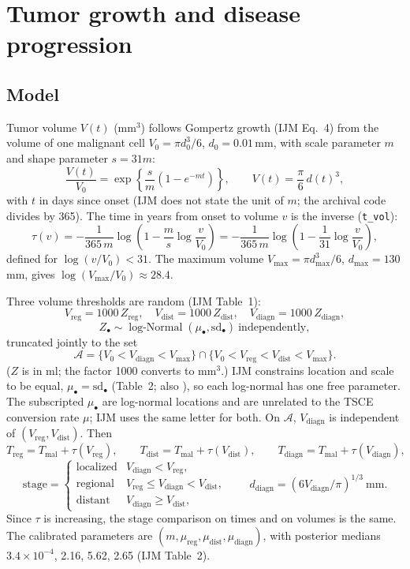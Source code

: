 \documentclass[11pt]{article}
\newcommand{\code}[1]{\texttt{#1}}
\newcommand{\LN}{\operatorname{log\text{-}Normal}}
\newcommand{\Tmal}{T_{\mathrm{mal}}}
\newcommand{\Treg}{T_{\mathrm{reg}}}
\newcommand{\Tdist}{T_{\mathrm{dist}}}
\newcommand{\Tdiagn}{T_{\mathrm{diagn}}}
\newcommand{\Vreg}{V_{\mathrm{reg}}}
\newcommand{\Vdist}{V_{\mathrm{dist}}}
\newcommand{\Vdiagn}{V_{\mathrm{diagn}}}
\begin{document}
\section{Tumor growth and disease progression}\label{sec:progression}

\subsection{Model}
Tumor volume $V(t)$ (mm$^3$) follows Gompertz growth (IJM Eq.~4) from the
volume of one malignant cell $V_0 = \pi d_0^3/6$, $d_0=0.01$\,mm, with scale
parameter $m$ and shape parameter $s = 31m$:
\[
\frac{V(t)}{V_0} = \exp\!\left\{\frac{s}{m}\left(1 - e^{-m t}\right)\right\},
\qquad V(t) = \frac{\pi}{6}\,d(t)^3 ,
\]
with $t$ in days since onset (IJM does not state the unit of $m$; the archival
code divides by 365). The time in years from onset to volume $v$ is the inverse
(\code{t\_vol}):
\begin{equation}\label{eq:tvol}
\tau(v) = -\frac{1}{365\,m}\log\!\left(1 - \frac{m}{s}\log\frac{v}{V_0}\right)
        = -\frac{1}{365\,m}\log\!\left(1 - \frac{1}{31}\log\frac{v}{V_0}\right),
\end{equation}
defined for $\log(v/V_0) < 31$. The maximum volume
$V_{\max}=\pi d_{\max}^3/6$, $d_{\max}=130$\,mm, gives $\log(V_{\max}/V_0)\approx 28.4$.

Three volume thresholds are random (IJM Table~1):
\[
\Vreg = 1000\,Z_{\mathrm{reg}},\quad \Vdist = 1000\,Z_{\mathrm{dist}},\quad
\Vdiagn = 1000\,Z_{\mathrm{diagn}},
\]
\[
Z_\bullet \sim \LN(\mu_\bullet, \mathrm{sd}_\bullet)\ \text{independently},
\]
truncated jointly to the set
\begin{equation}\label{eq:truncset}
\mathcal{A} = \{V_0 < \Vdiagn < V_{\max}\} \cap \{V_0 < \Vreg < \Vdist < V_{\max}\}.
\end{equation}
($Z$ is in ml; the factor 1000 converts to mm$^3$.) IJM constrains location and
scale to be equal, $\mu_\bullet = \mathrm{sd}_\bullet$ (Table~2; also
\cite{mdm2021}), so each log-normal has one free parameter. The subscripted
$\mu_\bullet$ are log-normal locations and are unrelated to the TSCE
conversion rate $\mu$; IJM uses the same letter for both. On $\mathcal{A}$,
$\Vdiagn$ is independent of $(\Vreg,\Vdist)$. Then
\[
\Treg = \Tmal + \tau(\Vreg),\qquad \Tdist = \Tmal + \tau(\Vdist),\qquad
\Tdiagn = \Tmal + \tau(\Vdiagn),
\]
\[
\mathrm{stage} = \begin{cases}\text{localized} & \Vdiagn < \Vreg,\\
\text{regional} & \Vreg \le \Vdiagn < \Vdist,\\
\text{distant} & \Vdiagn \ge \Vdist,\end{cases}
\qquad d_{\mathrm{diagn}} = \left(6\Vdiagn/\pi\right)^{1/3}\ \text{mm}.
\]
Since $\tau$ is increasing, the stage comparison on times and on volumes is the same.
The calibrated parameters are $(m,\mu_{\mathrm{reg}},\mu_{\mathrm{dist}},\mu_{\mathrm{diagn}})$,
with posterior medians $3.4\times10^{-4}$, 2.16, 5.62, 2.65 (IJM Table~2).
\end{document}
